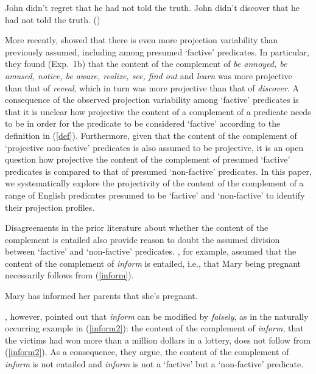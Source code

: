 \documentclass[11pt,fleqn]{article}
\newcommand{\6}{\mbox{$[\hspace*{-.6mm}[$}}
\newcommand{\9}{\mbox{$]\hspace*{-.6mm}]$}}
\begin{document}
\begin{exe}
\ex\label{semi-factive}
\begin{xlist}
\ex John didn't regret that he had not told the truth.
\ex John didn't discover that he had not told the truth.  
\hfill (\citealt[63]{karttunen71b})

\end{xlist}
\end{exe}
More recently, \citet*{tbd-variability} showed that there is even more projection variability than previously assumed, including among presumed `factive' predicates. In particular, they found (Exp.~1b) that the content of the complement of {\em be annoyed, be amused, notice, be aware, realize, see, find out} and {\em learn} was more projective than that of {\em reveal}, which in turn was more projective than that of {\em discover}.  A consequence of the observed projection variability among `factive' predicates is that it is unclear how projective the content of a complement of a predicate needs to be in order for the predicate to be considered `factive' according to the definition in (\ref{def}). Furthermore, given that the content of the complement of `projective non-factive' predicates is also assumed to be projective, it is an open question how projective the content of the complement of presumed `factive' predicates is compared to that of presumed `non-factive' predicates. In this paper, we systematically explore the projectivity of the content of the complement of a range of English predicates presumed to be `factive' and `non-factive' to identify their projection profiles.

Disagreements in the prior literature about whether the content of the complement is entailed also provide reason to doubt the assumed division between `factive'  and `non-factive' predicates. \citet[139]{schlenker10}, for example, assumed that the content of the complement of {\em inform} is entailed, i.e., that Mary being pregnant necessarily follows from (\ref{inform}).  

\begin{exe}
\ex\label{inform} Mary has informed her parents that she's pregnant.

\end{exe}
\citet[76]{anand-hacquard2014}, however, pointed out that {\em inform} can be modified by {\em falsely}, as in the naturally occurring example in (\ref{inform2}): the content of the complement of {\em inform}, that the victims had won more than a million dollars in a lottery, does not follow from (\ref{inform2}). As a consequence, they argue, the content of the complement of {\em inform}  is not entailed and {\em inform} is not a `factive' but a `non-factive' predicate.
\end{document}
